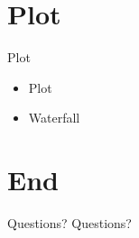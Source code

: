 \documentclass{beamer}
\begin{document}
\section{Plot}
\begin{frame}{Plot}
	\begin{itemize}
		\item Plot
		\item Waterfall
	\end{itemize}
\end{frame}

\section{End}
\begin{frame}{Questions?}
	Questions?
\end{frame}
\end{document}

